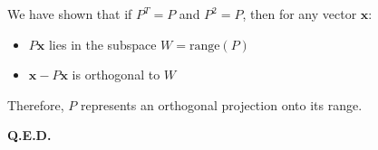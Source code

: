\documentclass{article}
\begin{document}
We have shown that if $P^T = P$ and $P^2 = P$, then for any vector $\mathbf{x}$:

\begin{itemize}
\item $P\mathbf{x}$ lies in the subspace $W = \text{range}(P)$
    \item $\mathbf{x} - P\mathbf{x}$ is orthogonal to $W$
\end{itemize}

Therefore, $P$ represents an orthogonal projection onto its range.


\textbf{Q.E.D.}
\end{document}
